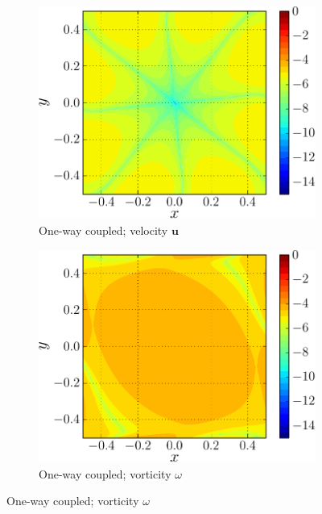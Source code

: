 \begin{figure}[!p]
     \begin{subfigure}[t]{0.45\textwidth}
             \includegraphics[width=\linewidth]{./figures/hybrid/lambOseent2/lambOseen_oneway_vErrorFinal_compressed-crop.pdf}
             \caption{One-way coupled; velocity $\mathbf{u}$}
             \label{fig:lambOseen_oneway_vErrorFinal}
     \end{subfigure}
     \qquad
     \begin{subfigure}[t]{0.45\textwidth}
             \includegraphics[width=\linewidth]{./figures/hybrid/lambOseent2/lambOseen_oneway_wErrorFinal_compressed-crop.pdf}
             \caption{One-way coupled; vorticity $\omega$}
             \label{fig:lambOseen_oneway_wErrorFinal}
     \end{subfigure}     
   

\end{figure}
